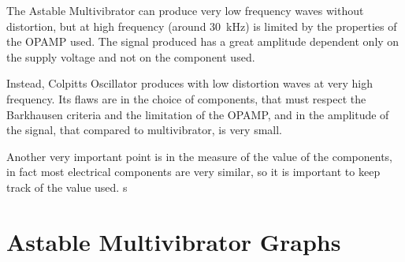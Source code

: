 \documentclass[a4paper, twocolumn]{article}
\begin{document}
The Astable Multivibrator can produce very low frequency waves without distortion, but at high frequency (around \SI{30}{\kilo\hertz}) is limited by the properties of the OPAMP used. The signal produced has a great amplitude dependent only on the supply voltage and not on the component used. 

Instead, Colpitts Oscillator produces with low distortion waves at very high frequency. Its flaws are in the choice of components, that must respect the Barkhausen criteria and the limitation of the OPAMP, and in the amplitude of the signal, that compared to multivibrator, is very small.

Another very important point is in the measure of the value of the components, in fact most electrical components are very similar, so it is important to keep track of the value used. 
s
\appendix
\onecolumn

\section{Astable Multivibrator Graphs}
\label{app:multivib}
\end{document}
